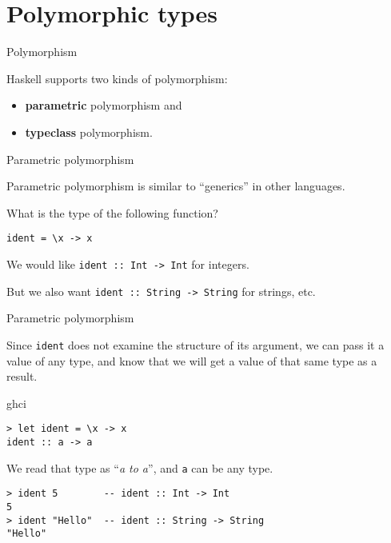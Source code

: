
\section{Polymorphic types}

%
\begin{frame}[fragile]{Polymorphism}

Haskell supports two kinds of polymorphism:

\begin{itemize}
  \item \textbf{parametric} polymorphism and
  \item \textbf{typeclass} polymorphism.
\end{itemize}

\end{frame}

%
\begin{frame}[fragile]{Parametric polymorphism}

Parametric polymorphism is similar to ``generics'' in other languages.

What is the type of the following function?

\begin{block}{}
\begin{verbatim}
ident = \x -> x
\end{verbatim}
\end{block}

We would like \texttt{ident :: Int -> Int} for integers.

But we also want \texttt{ident :: String -> String} for strings, etc.

\end{frame}

%
\begin{frame}[fragile]{Parametric polymorphism}

Since \texttt{ident} does not examine the structure of its argument, we can
pass it a value of any type, and know that we will get a value of that same type
as a result.

\begin{block}{ghci}
\begin{verbatim}
> let ident = \x -> x
ident :: a -> a
\end{verbatim}
\end{block}

We read that type as ``\emph{a to a}'', and \texttt{a} can be any type.

\begin{block}{}
\begin{verbatim}
> ident 5        -- ident :: Int -> Int
5
> ident "Hello"  -- ident :: String -> String
"Hello"
\end{verbatim}
\end{block}

\end{frame}

